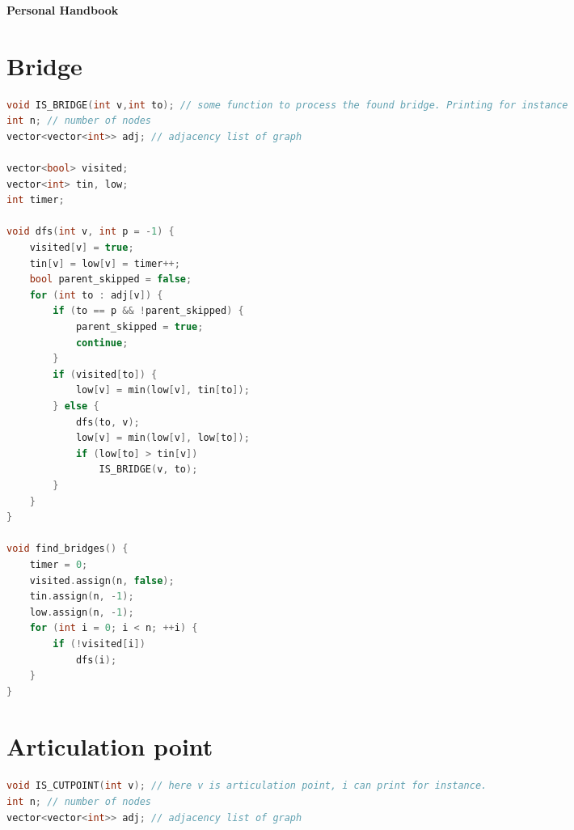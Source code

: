 \documentclass[a4paper,landscape]{article}
\begin{document}
\pagestyle{fancy}
\fancyhf{} %
\fancyfoot[C]{\thepage} %
\renewcommand{\headrulewidth}{0pt} %
\renewcommand{\footrulewidth}{0pt} %
\begin{titlepage}
    \centering
    \vspace*{3cm}
    {\Huge\bfseries Personal Handbook\par}
    \vspace{1.5cm}
    \begin{multicols}{3}
    \renewcommand{\contentsname}{}
    \tableofcontents
    \end{multicols}
\end{titlepage}
\newpage
\begin{multicols}{2}
\hline
\section{Bridge}
\hline
\begin{lstlisting}[language=C++]
void IS_BRIDGE(int v,int to); // some function to process the found bridge. Printing for instance
int n; // number of nodes
vector<vector<int>> adj; // adjacency list of graph

vector<bool> visited;
vector<int> tin, low;
int timer;

void dfs(int v, int p = -1) {
    visited[v] = true;
    tin[v] = low[v] = timer++;
    bool parent_skipped = false;
    for (int to : adj[v]) {
        if (to == p && !parent_skipped) {
            parent_skipped = true;
            continue;
        }
        if (visited[to]) {
            low[v] = min(low[v], tin[to]);
        } else {
            dfs(to, v);
            low[v] = min(low[v], low[to]);
            if (low[to] > tin[v])
                IS_BRIDGE(v, to);
        }
    }
}

void find_bridges() {
    timer = 0;
    visited.assign(n, false);
    tin.assign(n, -1);
    low.assign(n, -1);
    for (int i = 0; i < n; ++i) {
        if (!visited[i])
            dfs(i);
    }
}
\end{lstlisting}
\hline
\section{Articulation point}
\hline
\begin{lstlisting}[language=C++]
void IS_CUTPOINT(int v); // here v is articulation point, i can print for instance.
int n; // number of nodes
vector<vector<int>> adj; // adjacency list of graph


\end{lstlisting}
\end{multicols}
\end{document}
